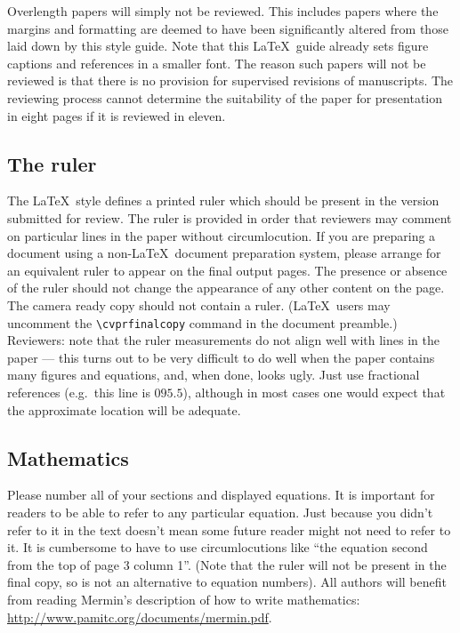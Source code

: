 \documentclass[10pt,twocolumn,letterpaper]{article}
\begin{document}
	Overlength papers will simply not be reviewed.  This includes papers
	where the margins and formatting are deemed to have been significantly
	altered from those laid down by this style guide.  Note that this
	\LaTeX\ guide already sets figure captions and references in a smaller font.
	The reason such papers will not be reviewed is that there is no provision for
	supervised revisions of manuscripts.  The reviewing process cannot determine
	the suitability of the paper for presentation in eight pages if it is
	reviewed in eleven.  
	
	\subsection{The ruler}
	The \LaTeX\ style defines a printed ruler which should be present in the
	version submitted for review.  The ruler is provided in order that
	reviewers may comment on particular lines in the paper without
	circumlocution.  If you are preparing a document using a non-\LaTeX\
	document preparation system, please arrange for an equivalent ruler to
	appear on the final output pages.  The presence or absence of the ruler
	should not change the appearance of any other content on the page.  The
	camera ready copy should not contain a ruler. (\LaTeX\ users may uncomment
	the \verb'\cvprfinalcopy' command in the document preamble.)  Reviewers:
	note that the ruler measurements do not align well with lines in the paper
	--- this turns out to be very difficult to do well when the paper contains
	many figures and equations, and, when done, looks ugly.  Just use fractional
	references (e.g.\ this line is $095.5$), although in most cases one would
	expect that the approximate location will be adequate.
	
	\subsection{Mathematics}
	
	Please number all of your sections and displayed equations.  It is
	important for readers to be able to refer to any particular equation.  Just
	because you didn't refer to it in the text doesn't mean some future reader
	might not need to refer to it.  It is cumbersome to have to use
	circumlocutions like ``the equation second from the top of page 3 column
	1''.  (Note that the ruler will not be present in the final copy, so is not
	an alternative to equation numbers).  All authors will benefit from reading
	Mermin's description of how to write mathematics:
	\url{http://www.pamitc.org/documents/mermin.pdf}.
	
\end{document}
